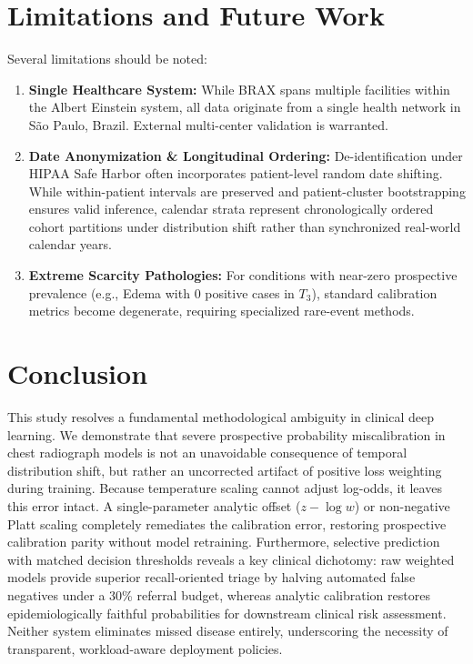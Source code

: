 \documentclass[journal]{IEEEtran}
\begin{document}
\section{Limitations and Future Work}
Several limitations should be noted:
\begin{enumerate}
    \item \textbf{Single Healthcare System:} While BRAX spans multiple facilities within the Albert Einstein system, all data originate from a single health network in S\~ao Paulo, Brazil. External multi-center validation is warranted.
    \item \textbf{Date Anonymization \& Longitudinal Ordering:} De-identification under HIPAA Safe Harbor often incorporates patient-level random date shifting. While within-patient intervals are preserved and patient-cluster bootstrapping ensures valid inference, calendar strata represent chronologically ordered cohort partitions under distribution shift rather than synchronized real-world calendar years.
    \item \textbf{Extreme Scarcity Pathologies:} For conditions with near-zero prospective prevalence (e.g., Edema with 0 positive cases in $T_3$), standard calibration metrics become degenerate, requiring specialized rare-event methods.
\end{enumerate}

\section{Conclusion}
This study resolves a fundamental methodological ambiguity in clinical deep learning. We demonstrate that severe prospective probability miscalibration in chest radiograph models is not an unavoidable consequence of temporal distribution shift, but rather an uncorrected artifact of positive loss weighting during training. Because temperature scaling cannot adjust log-odds, it leaves this error intact. A single-parameter analytic offset ($z - \log w$) or non-negative Platt scaling completely remediates the calibration error, restoring prospective calibration parity without model retraining. Furthermore, selective prediction with matched decision thresholds reveals a key clinical dichotomy: raw weighted models provide superior recall-oriented triage by halving automated false negatives under a 30\% referral budget, whereas analytic calibration restores epidemiologically faithful probabilities for downstream clinical risk assessment. Neither system eliminates missed disease entirely, underscoring the necessity of transparent, workload-aware deployment policies.



\end{document}
